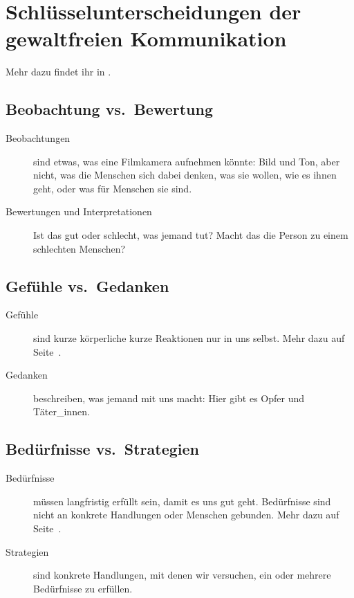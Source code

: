 \section{Schlüsselunterscheidungen der gewaltfreien Kommunikation}

Mehr dazu findet ihr in \cite[S. 35ff]{gfk-dummies}.

\subsection{Beobachtung vs.~Bewertung}

\begin{description}
 \item[Beobachtungen] sind etwas, was eine Filmkamera aufnehmen könnte: Bild und Ton, aber nicht, was die Menschen sich dabei denken, was sie wollen, wie es ihnen geht, oder was für Menschen sie sind.
 \item[Bewertungen und Interpretationen] Ist das gut oder schlecht, was jemand tut? Macht das die Person zu einem schlechten Menschen?
\end{description}


\subsection{Gefühle vs.~Gedanken}

\begin{description}
 \item[Gefühle] sind kurze körperliche kurze Reaktionen nur in uns selbst. Mehr dazu auf Seite~\pageref{gefuehle}.
 \item[Gedanken] beschreiben, was jemand mit uns macht: Hier gibt es Opfer und Täter\_innen.
\end{description}


\subsection{Bedürfnisse vs.~Strategien}

\begin{description}
 \item[Bedürfnisse] müssen langfristig erfüllt sein, damit es uns gut geht. Bedürfnisse sind nicht an konkrete Handlungen oder Menschen gebunden. Mehr dazu auf Seite~\pageref{beduerfnisse}.
 \item[Strategien] sind konkrete Handlungen, mit denen wir versuchen, ein oder mehrere Bedürfnisse zu erfüllen.
\end{description}
